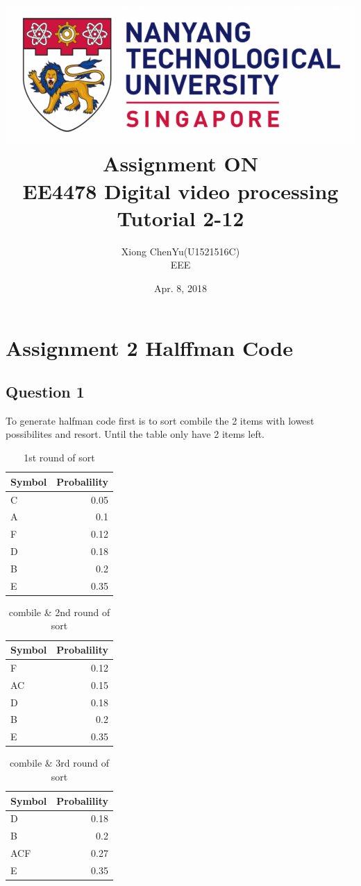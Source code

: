 \documentclass[titlepage]{article}
\author{Xiong ChenYu(U1521516C) \\
EEE \\
}
\date{Apr. 8, 2018 \\
}
\title{\includegraphics[width=\textwidth]{img/NTU.png} \\
[2\baselineskip] Assignment ON \\
EE4478 Digital video processing\\
Tutorial 2-12 \\
[3\baselineskip]}
\begin{document}
\maketitle
\tableofcontents

\listoflistings

\newpage


\section{Assignment 2 Halffman Code}
\label{sec:org5f80d0c}
\subsection{Question 1}
\label{sec:org2d265ba}

   To generate halfman code first is to sort combile the 2 items with lowest possibilites and resort. Until the table only have 2
items left.

\begin{table}[htbp]
\caption{1st round of sort}
\centering
\begin{tabular}{lr}
Symbol & Probalility\\
\hline
C & 0.05\\
A & 0.1\\
F & 0.12\\
D & 0.18\\
B & 0.2\\
E & 0.35\\
\end{tabular}
\end{table}

\begin{table}[htbp]
\caption{combile \& 2nd round of sort}
\centering
\begin{tabular}{lr}
Symbol & Probalility\\
\hline
F & 0.12\\
AC & 0.15\\
D & 0.18\\
B & 0.2\\
E & 0.35\\
\end{tabular}
\end{table}

\begin{table}[htbp]
\caption{\label{fig:label}combile \& 3rd round of sort}
\centering
\begin{tabular}{lr}
Symbol & Probalility\\
\hline
D & 0.18\\
B & 0.2\\
ACF & 0.27\\
E & 0.35\\
\end{tabular}
\end{table}
\end{document}
